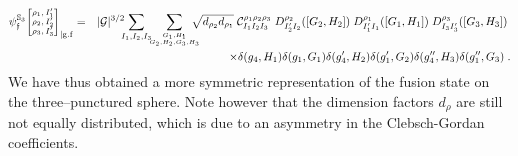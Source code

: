 \documentclass[nofootinbib,superscriptaddress,eqsecnum,tightenlines,11pt]{revtex4-1}
\def\nn{\nonumber}
\def\q{\qquad}
\def\mG{\mathcal{G}}
\def\ba{\begin{eqnarray}}
\def\ea{\end{eqnarray}}
\renewcommand{\S}{{\mathbb S}}
\begin{document}
\ba
	\label{3punct-sym}
	\psi^{\S_3}_{\frak f}
	 { \scriptsize\begin{bmatrix} \rho_1,I_1'\\ \rho_2,I_2'\\ \rho_3,I'_3\end{bmatrix}}_{|{\rm g.f}}
	&=&
	|\mG|^{3/2} \!\!\!\sum_{I_1, I_2,I_3}\!\!\! \sum_{G_1,H_1 \atop G_2, H_2,G_3,H_3}\!\!\!\!\!\!
	\sqrt{d_{\rho_2} d_{\rho_1} }\;
	\mathcal{C}^{\rho_1 \rho_2\rho_3}_{I_1 I_2 I_3}\;
	{D^{\rho_2}_{I'_2 I_2 }([G_2,H_2 ])} \;
 	{D^{\rho_1}_{I'_1 I_1}([G_1 ,H_1 ])}\;
	{D^{\rho_3}_{I_3 I'_3}([G_3 ,H_3 ])}\; \nn\\
 && \q\q\q \q \times \delta(g_4,H_1) \delta(g_1,G_1) \delta(g'_4,H_2) \delta(g'_1,G_2)   \delta(g''_4,H_3) \delta(g''_1, G_3) \; .
\ea
We have thus obtained a more symmetric representation of the fusion state on the three--punctured sphere. Note however that the dimension factors $d_\rho$ are still not equally distributed, which is due to an asymmetry in the Clebsch-Gordan coefficients.
\end{document}

